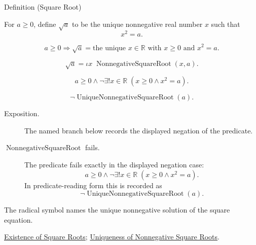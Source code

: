 \begin{definitionbox}{Definition (Square Root)}
\begin{definition}
\label{def:square-root}
For $a\ge 0$, define $\sqrt a$ to be the unique nonnegative real number $x$
such that
\[
x^2=a.
\]
\end{definition}
\end{definitionbox}
\begin{remark*}
\[
a\ge 0
\Rightarrow
\sqrt a=\text{the unique }x\in\mathbb{R}\text{ with }x\ge 0\text{ and }x^2=a.
\]
\end{remark*}
\begin{remark*}
\[
\sqrt a=\iota x\;\operatorname{NonnegativeSquareRoot}(x,a).
\]
\end{remark*}
\begin{remark*}
\[
a\ge 0\land
\neg\exists!x\in\mathbb{R}\;(x\ge 0\land x^2=a).
\]
\end{remark*}
\begin{remark*}
\[
\neg\operatorname{UniqueNonnegativeSquareRoot}(a).
\]
\end{remark*}

\begin{remark*}
\begin{description}
  \item[Exposition.] The named branch below records the displayed negation of the predicate.
  \item[\(\operatorname{NonnegativeSquareRoot}\) fails.] The predicate fails exactly in the displayed negation case:
  \[
  a\ge 0\land
  \neg\exists!x\in\mathbb{R}\;(x\ge 0\land x^2=a).
  \]
  In predicate-reading form this is recorded as
  \[
  \neg\operatorname{UniqueNonnegativeSquareRoot}(a).
  \]
\end{description}
\end{remark*}
\begin{remark*}[Interpretation]
The radical symbol names the unique nonnegative solution of the square
equation.
\end{remark*}
\begin{dependencies}
\hyperref[thm:existence-of-square-roots]{Existence of Square Roots};
\hyperref[thm:uniqueness-of-nonnegative-square-roots]{Uniqueness of Nonnegative Square Roots}.
\end{dependencies}

